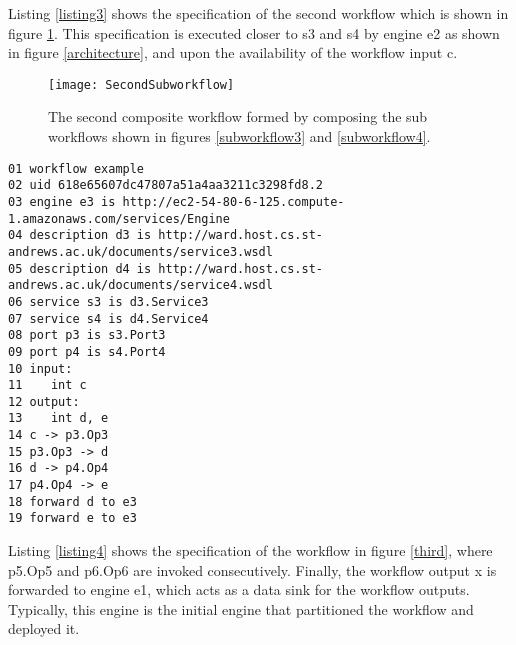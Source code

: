 \documentclass[10pt, conference, compsocconf]{IEEEtran}
\newenvironment{ppl}{\small\ttfamily}{}
\begin{document}
Listing \ref{listing3} shows the specification of the second workflow which is shown in figure \ref{second}.
This specification is executed closer to \begin{ppl}s3\end{ppl} and \begin{ppl}s4\end{ppl} by engine \begin{ppl}e2\end{ppl} as shown in figure \ref{architecture}, and upon the availability of the workflow input \begin{ppl}c\end{ppl}.

\begin{figure}[h]
\centerline{\texttt{[image: SecondSubworkflow]}}
\caption{The second composite workflow formed by composing the sub workflows shown in figures \ref{subworkflow3} and \ref{subworkflow4}.}
\label{second}
\end{figure}

\begin{lstlisting}[keywords={uid, future, workflow, forward, engine, description, service, port, engine, is, input, output, int, any, transmit, to}, caption={Specification of the second composite workflow shown in figure \ref{second}.}, label={listing3}, frame=single]
01 workflow example
02 uid 618e65607dc47807a51a4aa3211c3298fd8.2
03 engine e3 is http://ec2-54-80-6-125.compute-1.amazonaws.com/services/Engine
04 description d3 is http://ward.host.cs.st-andrews.ac.uk/documents/service3.wsdl
05 description d4 is http://ward.host.cs.st-andrews.ac.uk/documents/service4.wsdl
06 service s3 is d3.Service3
07 service s4 is d4.Service4
08 port p3 is s3.Port3
09 port p4 is s4.Port4
10 input: 
11    int c
12 output:
13    int d, e
14 c -> p3.Op3
15 p3.Op3 -> d
16 d -> p4.Op4
17 p4.Op4 -> e
18 forward d to e3
19 forward e to e3
\end{lstlisting}

Listing \ref{listing4} shows the specification of the workflow in figure \ref{third}, where \begin{ppl}p5.Op5\end{ppl} and \begin{ppl}p6.Op6\end{ppl} are invoked consecutively.
Finally, the workflow output \begin{ppl}x\end{ppl} is forwarded to engine \begin{ppl}e1\end{ppl}, which acts as a data sink for the workflow outputs.
Typically, this engine is the initial engine that partitioned the workflow and deployed it.
\end{document}
